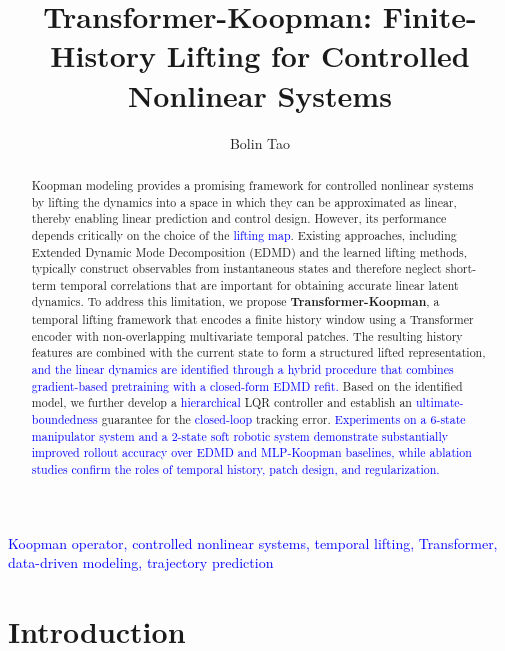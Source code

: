 \documentclass[journal]{IEEEtran}
\begin{document}
\title{Transformer-Koopman: Finite-History Lifting for Controlled Nonlinear Systems}

\author{Bolin Tao}


\maketitle

\begin{abstract}
Koopman modeling provides a promising framework for controlled nonlinear systems by lifting the dynamics into a space in which they can be approximated as linear, thereby enabling linear prediction and control design. However, its performance depends critically on the choice of the \textcolor{blue}{lifting map}. Existing approaches, including Extended Dynamic Mode Decomposition (EDMD) and the learned lifting methods, typically construct observables from instantaneous states and therefore neglect short-term temporal correlations that are important for obtaining accurate linear latent dynamics.
To address this limitation, we propose \textbf{Transformer-Koopman}, a temporal lifting framework that encodes a finite history window using a Transformer encoder with non-overlapping multivariate temporal patches. The resulting history features are combined with the current state to form a structured lifted representation, \textcolor{blue}{and the linear dynamics are identified through a hybrid procedure that combines gradient-based pretraining with a closed-form EDMD refit.}
Based on the identified model, we further develop a \textcolor{blue}{hierarchical} LQR controller and establish an \textcolor{blue}{ultimate-boundedness} guarantee for the \textcolor{blue}{closed-loop} tracking error. \textcolor{blue}{Experiments on a 6-state manipulator system and a 2-state soft robotic system demonstrate substantially improved rollout accuracy over EDMD and MLP-Koopman baselines, while ablation studies confirm the roles of temporal history, patch design, and regularization.}
\end{abstract}

\begin{IEEEkeywords}
\textcolor{blue}{Koopman operator, controlled nonlinear systems, temporal lifting, Transformer, data-driven modeling, trajectory prediction}
\end{IEEEkeywords}

\section{Introduction}
\label{sec:introduction}
\end{document}
